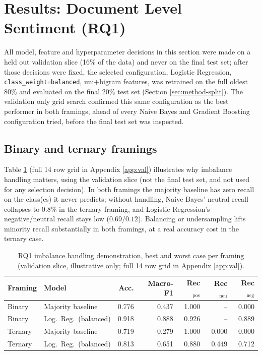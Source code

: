 \documentclass[11pt,a4paper,DIV=12]{scrartcl}
\begin{document}
\section{Results: Document Level Sentiment (RQ1)}
\label{sec:rq1}

All model, feature and hyperparameter decisions in this section were made on
a held out validation slice (16\% of the data) and never on the
final test set; after those decisions were fixed, the selected configuration,
Logistic Regression, \texttt{class\_weight=balanced}, uni+bigram features,
was retrained on the full oldest 80\% and evaluated on the final 20\% test set
(Section \ref{sec:method-split}). The validation only grid search confirmed
this same configuration as the best performer in both framings, ahead of every
Naive Bayes and Gradient Boosting configuration tried, before the final
test set was inspected.

\subsection{Binary and ternary framings}
Table \ref{tab:rq1demo} (full 14 row grid in Appendix \ref{app:val})
illustrates why imbalance handling matters,
using the validation slice (not the final test set, and not used for any
selection decision). In both framings the majority baseline has zero
recall on the class(es) it never predicts; without handling, Naive Bayes'
neutral recall collapses to $0.8\%$ in the ternary framing, and Logistic
Regression's negative/neutral recall stays low ($0.69$/$0.12$). Balancing or
undersampling lifts minority recall substantially in both framings, at a real
accuracy cost in the ternary case.

\begin{table}[H]
\centering
\caption{RQ1 imbalance handling demonstration, best and worst case per framing
(validation slice, illustrative only; full 14 row grid in Appendix
\ref{app:val}).}
\label{tab:rq1demo}
\setlength{\tabcolsep}{4pt}
\begin{tabular}{llrrrrr}
\toprule
Framing & Model & Acc. & Macro-F1 & Rec$_{\text{pos}}$ & Rec$_{\text{neu}}$ & Rec$_{\text{neg}}$ \\
\midrule
Binary & Majority baseline           & 0.776 & 0.437 & 1.000 & --    & 0.000 \\
Binary & Log.\ Reg.\ (balanced) & 0.918 & 0.888 & 0.926 & -- & 0.889 \\
\midrule
Ternary & Majority baseline          & 0.719 & 0.279 & 1.000 & 0.000 & 0.000 \\
Ternary & Log.\ Reg.\ (balanced) & 0.813 & 0.651 & 0.880 & 0.449 & 0.712 \\
\bottomrule
\end{tabular}
\end{table}
\end{document}
